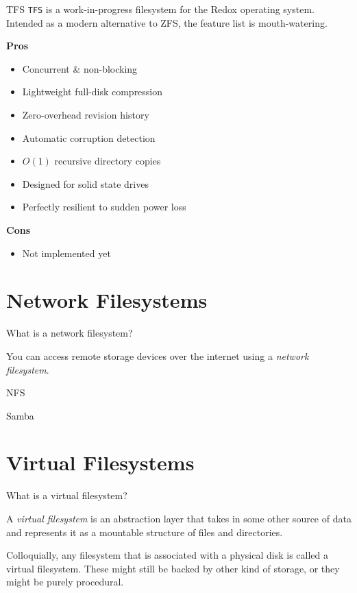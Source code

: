 \documentclass{lug}
\begin{document}
\begin{frame}{TFS}
\texttt{TFS} is a work-in-progress filesystem for the Redox operating system.
Intended as a modern alternative to ZFS, the feature list is mouth-watering.

\textbf{Pros}\begin{itemize}
    \item Concurrent \& non-blocking
    \item Lightweight full-disk compression
    \item Zero-overhead revision history
    \item Automatic corruption detection
    \item $O(1)$ recursive directory copies
    \item Designed for solid state drives
    \item Perfectly resilient to sudden power loss 
\end{itemize}

\textbf{Cons}\begin{itemize}
    \item Not implemented yet
\end{itemize}
\end{frame}

\section{Network Filesystems}
\begin{frame}{What is a network filesystem?}
\begin{center}
    You can access remote storage devices over the internet using a
    \emph{network filesystem}.
\end{center}
\end{frame}

\begin{frame}{NFS}
\end{frame}

\begin{frame}{Samba}
\end{frame}

\section{Virtual Filesystems}
\begin{frame}{What is a virtual filesystem?}
\begin{center}
    A \emph{virtual filesystem} is an abstraction layer that takes in some other
    source of data and represents it as a mountable structure of files and
    directories.

    Colloquially, any filesystem that is associated with a physical disk is
    called a virtual filesystem. These might still be backed by other kind of
    storage, or they might be purely procedural.
\end{center}
\end{frame}
\end{document}
